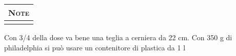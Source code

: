 \begin{minipage}[t][\textheight][t]{\textwidth}
\begin{minipage}[t]{0.65\textwidth}
    \end{minipage}
    
    \vspace*{\fill}

    \begin{tabularx}{\linewidth}{X}
    {\Large \textsc{Note}} \\ \hline \hline \\
    \end{tabularx}
	Con 3/4 della dose va bene una teglia a cerniera da 22 cm. Con 350 g di philadelphia si può usare un contenitore di plastica da 1 l
    
\end{minipage}